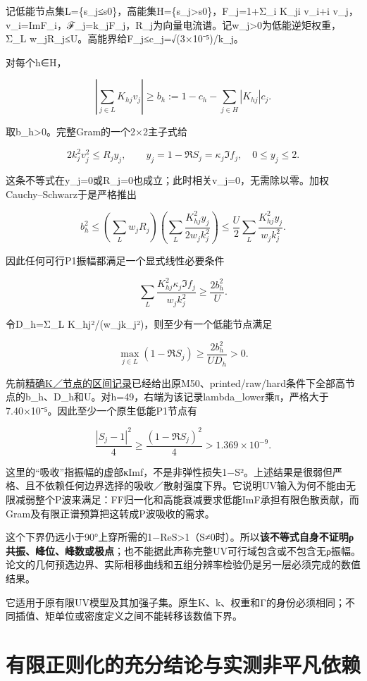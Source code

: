 \documentclass[
  10pt,
  a4paper,
]{article}
\begin{document}
记低能节点集L=\{s\_j≤s0\}，高能集H=\{s\_j\textgreater s0\}，F\_j=1+Σ\_i
K\_ji v\_i+i
v\_j，v\_i=ImF\_i，ℱ\_j=k\_jF\_j，R\_j为向量电流谱。记w\_j\textgreater0为低能逆矩权重，Σ\_L
w\_jR\_j≤U。高能界给\textbar F\_j\textbar≤c\_j=√(3×10⁻⁵)/k\_j。

对每个h∈H，

\[
\left|\sum_{j\in L}K_{hj}v_j\right|
\ge b_h:=1-c_h-\sum_{j\in H}|K_{hj}|c_j.
\]

取b\_h\textgreater0。完整Gram的一个2×2主子式给

\[
2k_j^2v_j^2\le R_j y_j,\qquad
 y_j=1-\Re S_j=\kappa_j\Im f_j,\quad0\le y_j\le2.
\]

这条不等式在y\_j=0或R\_j=0也成立；此时相关v\_j=0，无需除以零。加权Cauchy--Schwarz于是严格推出

\[
 b_h^2\le
 \left(\sum_{L}w_jR_j\right)
 \left(\sum_L\frac{K_{hj}^2 y_j}{2w_jk_j^2}\right)
 \le\frac U2\sum_L\frac{K_{hj}^2y_j}{w_jk_j^2}.
\]

因此任何可行P1振幅都满足一个显式线性必要条件

\[
\boxed{\sum_L\frac{K_{hj}^2\kappa_j\Im f_j}{w_jk_j^2}
\ge\frac{2b_h^2}{U}}.
\]

令D\_h=Σ\_L K\_hj²/(w\_jk\_j²)，则至少有一个低能节点满足

\[
\max_{j\in L}(1-\Re S_j)
\ge\frac{2b_h^2}{U D_h}>0.
\]

先前\href{../../../GLOBAL_IR_UV_EXCLUSION.json}{精确K／节点的区间记录}已经给出原M50、printed/raw/hard条件下全部高节点的b\_h、D\_h和U。对h=49，右端为该记录lambda\_lower乘π，严格大于7.40×10⁻⁵。因此至少一个原生低能P1节点有

\[
\frac{|S_j-1|^2}{4}\ge\frac{(1-\Re S_j)^2}{4}
>1.369\times10^{-9}.
\]

这里的``吸收''指振幅的虚部κImf，不是非弹性损失1−\textbar S\textbar²。上述结果是很弱但严格、且不依赖任何边界选择的吸收／散射强度下界。它说明UV输入为何不能由无限减弱整个P波来满足：FF归一化和高能衰减要求低能ImF承担有限色散贡献，而Gram及有限正谱预算把这转成P波吸收的需求。

这个下界仍远小于90°上穿所需的1−ReS\textgreater1（S≠0时）。所以\textbf{该不等式自身不证明ρ共振、峰位、峰数或极点}；也不能据此声称完整UV可行域包含或不包含无ρ振幅。论文的几何预选边界、实际相移曲线和五组分辨率检验仍是另一层必须完成的数值结果。

它适用于原有限UV模型及其加强子集。原生K、k、权重和Γ的身份必须相同；不同插值、矩单位或密度定义之间不能转移该数值下界。

\newpage

\section{有限正则化的充分结论与实测非平凡依赖}\label{ux6709ux9650ux6b63ux5219ux5316ux7684ux5145ux5206ux7ed3ux8bbaux4e0eux5b9eux6d4bux975eux5e73ux51e1ux4f9dux8d56}
\end{document}
